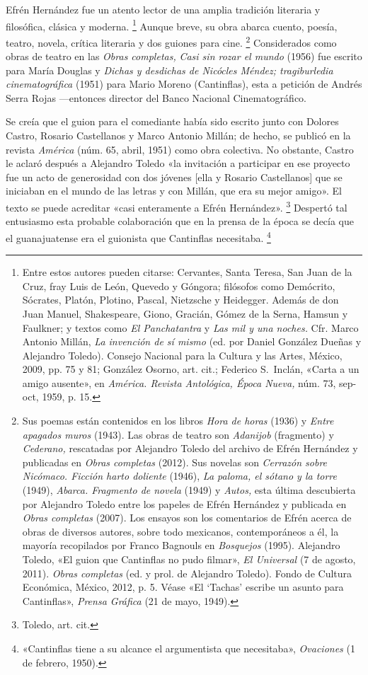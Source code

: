\documentclass[14pt,twoside,final]{extbook} %
\let\oldfootnote\footnote
\renewcommand\footnote[1]{%
\oldfootnote{\hspace{1mm}#1}}
\newcommand{\nota}[1]{\marginpar{\color{blue}\tiny #1}}%
\begin{document}
Efrén Hernández fue un atento lector de una amplia tradición literaria y filosófica, clásica y moderna.\footnote{Entre estos autores pueden citarse: Cervantes, Santa Teresa, San Juan de la Cruz, fray Luis de León, Quevedo y Góngora; filósofos como Demócrito, Sócrates, Platón, Plotino, Pascal, Nietzsche y Heidegger. Además de don Juan Manuel, Shakespeare, Giono, Gracián, Gómez de la Serna, Hamsun y Faulkner; y textos como \emph{El Panchatantra} y \emph{Las mil y una noches.} Cfr. Marco Antonio Millán, \emph{La invención de sí mismo} (ed. por Daniel González Dueñas y Alejandro Toledo). Consejo Nacional para la Cultura y las Artes, México, 2009, pp. 75 y 81; González Osorno, art. cit.; Federico S.~Inclán, «Carta a un amigo ausente», en \emph{América. Revista Antológica, Época Nueva,} núm. 73, sep-oct, 1959, p. 15.} Aunque breve, su obra abarca cuento, poesía, teatro, novela, crítica literaria y dos guiones para cine.\footnote{Sus poemas están contenidos en los libros \emph{Hora de horas} (1936) y \emph{Entre apagados muros} (1943). Las obras de teatro son \emph{Adanijob} (fragmento) y \emph{Cederano,} rescatadas por Alejandro Toledo del archivo de Efrén Hernández y publicadas en \emph{Obras completas} (2012). Sus novelas son \emph{Cerrazón sobre Nicómaco. Ficción harto doliente} (1946), \emph{La paloma, el sótano y la torre} (1949), \emph{Abarca. Fragmento de novela} (1949) y \emph{Autos,} esta última descubierta por Alejandro Toledo entre los papeles de Efrén Hernández y publicada en \emph{Obras completas} (2007). Los ensayos son los comentarios de Efrén acerca de obras de diversos autores, sobre todo mexicanos, contemporáneos a él, la mayoría recopilados por Franco Bagnouls en \emph{Bosquejos} (1995). Alejandro Toledo, «El guion que Cantinflas no pudo filmar», \emph{El Universal} (7 de agosto, 2011). \emph{Obras completas} (ed. y prol. de Alejandro Toledo). Fondo de Cultura Económica, México, 2012, p. 5. Véase «El `Tachas' escribe un asunto para Cantinflas», \emph{Prensa Gráfica} (21 de mayo, 1949).} Considerados como obras de teatro en las \emph{Obras completas,} \emph{Casi sin rozar el mundo} (1956) fue escrito para María Douglas y \emph{Dichas y desdichas de Nicócles Méndez; tragiburledia cinematográfica} (1951) para Mario Moreno (Cantinflas), esta a petición de Andrés Serra Rojas ---entonces director del Banco Nacional Cinematográfico.

Se creía que el guion para el comediante había sido escrito junto con Dolores Castro, Rosario Castellanos y Marco Antonio Millán; de hecho, se publicó en la revista \emph{América} (núm. 65, abril, 1951) como obra colectiva. No obstante, Castro le aclaró después a Alejandro Toledo «la invitación a participar en ese proyecto fue un acto de generosidad con dos jóvenes [ella y Rosario Castellanos] que se iniciaban en el mundo de las letras y con Millán, que era su mejor amigo». El texto se puede acreditar «casi enteramente a Efrén Hernández».\footnote{Toledo, art. cit.} Despertó tal entusiasmo esta probable colaboración que en la prensa de la época se decía que el guanajuatense era el guionista que Cantinflas necesitaba.\footnote{«Cantinflas tiene a su alcance el argumentista que necesitaba», \emph{Ovaciones} (1 de febrero, 1950).} %
\end{document}
